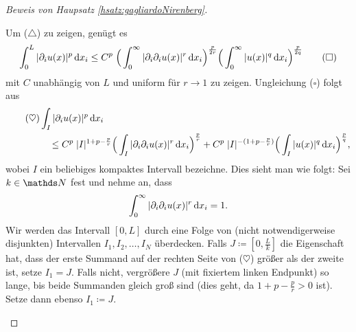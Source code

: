 \begin{proof}[Beweis von Haupsatz \ref{hsatz:gagliardoNirenberg}]
\begin{enumerate}
      Um ($\triangle$) zu zeigen, genügt es
      \begin{align*}
        \int_0^L |\partial_i u(x)|^p \, {\operatorname{d}\!{x}}_i
        \leq C^p \; \Big( \int_0^\infty |\partial_i \partial_i u(x) |^r \, {\operatorname{d}\!{x}}_i \Big)^{\frac{p}{2r}} \Big( \int_0^\infty |u(x)|^q \, {\operatorname{d}\!{x}}_i \Big)^{\frac{p}{2q}}
        \tag{$\square$}
      \end{align*}
      mit $C$ unabhängig von $L$ und uniform für $r \to 1$ zu zeigen.
      Ungleichung ($\square$) folgt aus 
      \begin{align*} 
        \tag{$\heartsuit$}       
        &\int_I |\partial_i u(x)|^p \, {\operatorname{d}\!{x}}_i \\
        &\quad \leq C^p \; |I|^{1 + p - \frac{p}{r}} \Big( \int_I |\partial_i \partial_i u(x)|^r \, {\operatorname{d}\!{x}}_i \Big)^{\frac{p}{r}} + C^p \; |I|^{-(1 + p - \frac{p}{r})} \Big( \int_I |u(x)|^q \, {\operatorname{d}\!{x}}_i \Big)^{\frac{p}{q}},
      \end{align*}
      wobei $I$ ein beliebiges kompaktes Intervall bezeichne.
      Dies sieht man wie folgt: 
      Sei $k \in \N$ fest und nehme an, dass 
      $$
      \int_0^\infty |\partial_i \partial_i u(x)|^r \, {\operatorname{d}\!{x}}_i = 1.
      $$
      Wir werden das Intervall $[0,L]$ durch eine Folge von (nicht notwendigerweise disjunkten) Intervallen $I_1,I_2,\dots,I_N$ überdecken.
      Falls $J \coloneqq [0, \frac{L}{k}]$ die Eigenschaft hat, dass der erste Summand auf der rechten Seite von ($\heartsuit$) größer als der zweite ist, setze $I_1 = J$.
      Falls nicht, vergrößere $J$ (mit fixiertem linken Endpunkt) so lange, bis beide Summanden gleich groß sind (dies geht, da $1 + p - \frac{p}{r} > 0$ ist). 
      Setze dann ebenso $I_1 \coloneqq J$.


\end{enumerate}
\end{proof}
